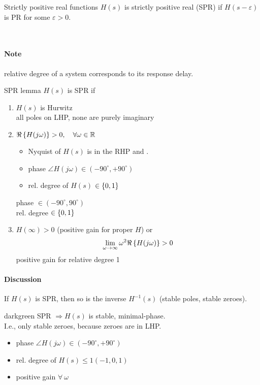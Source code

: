 \begin{definition}{Strictly positive real functions}
$H(s)$ is strictly positive real (SPR) if $H(s - \varepsilon)$ 
is PR for some $\varepsilon > 0$.
\end{definition}~

\paragraph{Note} relative degree of a system corresponds to
its response delay.

\begin{lemma}{SPR lemma}
$H(s)$ is SPR if
\begin{enumerate}[label=(\roman*)]
    \item $H(s)$ is Hurwitz\\
        all poles on LHP, none are purely imaginary
    \item $\Re \left\lbrace H(j\omega) \right\rbrace > 0, \quad \forall \omega \in \mathbb{R}$
        \begin{itemize}
            \item Nyquist of $H(s)$ is in the RHP and .
            \item phase $\angle H(j\omega) \in (-90^{\circ}, +90^{\circ})$
            \item rel. degree of $H(s)$ $\in \left\lbrace 0,1 \right\rbrace$
        \end{itemize}
        phase $\in (-90 ^{\circ}, 90 ^{\circ})$\\
        rel. degree $\in \left\lbrace 0, 1 \right\rbrace$
    \item $H( \infty) > 0$ (positive gain for proper $H$) or 
        \begin{alignat*}{3}
        \lim_{\omega \rightarrow \infty} \omega^2 \Re \left\lbrace H(j\omega) \right\rbrace > 0
        \end{alignat*}
        positive gain for relative degree 1
\end{enumerate}
\end{lemma}

\paragraph{Discussion}
If $H(s)$ is SPR, then so is the inverse $H^{-1}(s)$
(stable poles, stable zeroes).\\

\begin{conclusion}{darkgreen}
    SPR  $\Rightarrow H(s)$ is stable, minimal-phase.\\
    I.e., only stable zeroes, because zeroes are in LHP.
    \begin{itemize}
        \item phase $\angle H(j\omega) \in (-90^{\circ}, +90^{\circ})$
        \item rel. degree of $H(s) \leq 1 (-1, 0, 1)$
        \item positive gain $\forall ~ \omega$
    \end{itemize}
\end{conclusion}~

